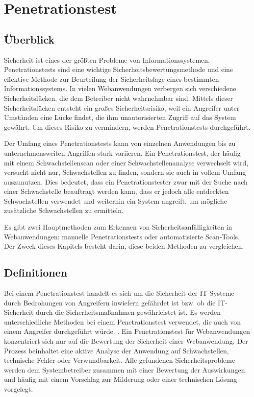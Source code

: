 \chapter{Penetrationstest}
\label{cha:k4}

\section{Überblick}

Sicherheit ist eines der größten Probleme von Informationssystemen. Penetrationstests sind eine wichtige Sicherheitsbewertungsmethode und eine effektive Methode zur Beurteilung der Sicherheitslage eines bestimmten Informationssystems. In vielen Webanwendungen verbergen sich verschiedene Sicherheitslücken, die dem Betreiber nicht wahrnehmbar sind. Mittels dieser Sicherheitslücken entsteht ein großes Sicherheitsrisiko, weil ein Angreifer unter Umständen eine Lücke findet, die ihm unautorisierten Zugriff auf das System gewährt. Um dieses Risiko zu vermindern, werden Penetrationstests durchgeführt.

Der Umfang eines Penetrationstests kann von einzelnen Anwendungen bis zu unternehmensweiten Angriffen stark variieren. Ein Penetrationstest, der häufig mit einem Schwachstellenscan oder einer Schwachstellenanalyse verwechselt wird, versucht nicht nur, Schwachstellen zu finden, sondern sie auch in vollem Umfang auszunutzen. Dies bedeutet, dass ein Penetrationstester zwar mit der Suche nach einer Schwachstelle beauftragt werden kann, dass er jedoch alle entdeckten Schwachstellen verwendet und weiterhin ein System angreift, um mögliche zusätzliche Schwachstellen zu ermitteln\cite{northcutt2006}.

Es gibt zwei Hauptmethoden zum Erkennen von Sicherheitsanfälligkeiten in Webanwendungen: manuelle Penetrationstests oder automatisierte Scan-Tools. Der Zweck dieses Kapitels besteht darin, diese beiden Methoden zu vergleichen.

\section{Definitionen}

Bei einem Penetrationstest handelt es sich um die Sicherheit der IT-Systeme durch Bedrohungen von Angreifern inwiefern gefährdet ist bzw. ob die IT-Sicherheit durch die Sicherheitsmaßnahmen gewährleistet ist. Es werden unterschiedliche Methoden bei einem Penetrationstest verwendet, die auch von einem Angreifer durchgeführt würde. \cite[5--6]{pt03bsi}. Ein Penetrationstest für Webanwendungen konzentriert sich nur auf die Bewertung der Sicherheit einer Webanwendung. Der Prozess beinhaltet eine aktive Analyse der Anwendung auf Schwachstellen, technische Fehler oder Verwundbarkeit. Alle gefundenen Sicherheitsprobleme werden dem Systembetreiber zusammen mit einer Bewertung der Auswirkungen und häufig mit einem Vorschlag zur Milderung oder einer technischen Lösung vorgelegt\cite[46]{meucci2008owasp}.

